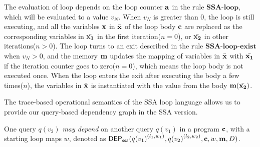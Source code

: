 The evaluation of loop depends on the loop counter ${\bf{{a}}}$ in the rule $\textbf{SSA-loop}$, which will be evaluated to a value $v_N$. When $v_N$ is greater than 0, the loop is still executing, and all the variables ${\bf{{x}}}$ in $\bar{{\bf{{x}}}}$ of the loop body ${\bf{{c}}}$ are replaced as the corresponding variables in $\bar{{\bf{{x_1}}}}$ in the first iteration($n=0$), or $\bar{{\bf{{x_2}}}}$ in other iterations($n > 0$). The loop turns to an exit described in the rule $\textbf{SSA-loop-exist}$ when $v_N > 0$, and the memory ${\bf{{m}}}$ updates the mapping of variables in $\bar{{\bf{{x}}}}$ with $\bar{{\bf{{x_1}}}}$ if the iteration counter goes to zero($n=0$), which means the loop body is not executed once. When the loop enters the exit after executing the body a few times($n$), the variables in $\bar{{\bf{{x}}}}$ is instantiated with the value from the body ${\bf{{m}}}(\bar{{\bf{{x_2}}}})$. 

 The trace-based operational semantics of the SSA loop language allows us to provide our query-based dependency graph in the SSA version.

\begin{defn}
One query ${q(v_2)}$ \emph{may depend} on another query ${q(v_1)}$ in a program ${\bf{{c}}}$, with a starting loop maps $w$, denoted as
 $\mathsf{DEP_{ssa}}({q(v_1)}^{(l_1, w_1)}, {q(v_2)}^{(l_2, w_2)}, {\bf{{c}}},w, {\bf{{m}}},D)$.
 
\end{defn}

